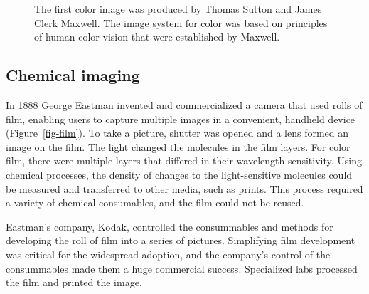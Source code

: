 \documentclass[
  letterpaper,
]{book}
\begin{document}
\begin{figure}


\caption{\label{fig-maxwell-sutton}The first color image was produced by
Thomas Sutton and James Clerk Maxwell. The image system for color was
based on principles of human color vision that were established by
Maxwell.}

\end{figure}%

\subsection{Chemical imaging}\label{sec-preface-film}

In 1888 George Eastman invented and commercialized a camera that used
rolls of film, enabling users to capture multiple images in a
convenient, handheld device (Figure~\ref{fig-film}). To take a picture,
shutter was opened and a lens formed an image on the film. The light
changed the molecules in the film layers. For color film, there were
multiple layers that differed in their wavelength sensitivity. Using
chemical processes, the density of changes to the light-sensitive
molecules could be measured and transferred to other media, such as
prints. This process required a variety of chemical consumables, and the
film could not be reused.

Eastman's company, Kodak, controlled the consummables and methods for
developing the roll of film into a series of pictures. Simplifying film
development was critical for the widespread adoption, and the company's
control of the consummables made them a huge commercial success.
Specialized labs processed the film and printed the image.
\end{document}
